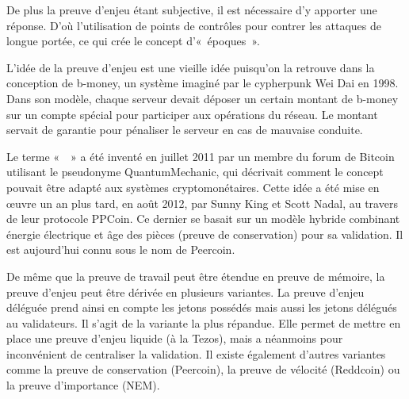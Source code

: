 %
De plus la preuve d'enjeu étant subjective, il est nécessaire d'y apporter une réponse. D'où l'utilisation de points de contrôles pour contrer les attaques de longue portée, ce qui crée le concept d'«~époques~».


L'idée de la preuve d'enjeu est une vieille idée puisqu'on la retrouve dans la conception de b-money, un système imaginé par le cypherpunk Wei Dai en 1998. Dans son modèle, chaque serveur devait déposer un certain montant de b-money sur un compte spécial pour participer aux opérations du réseau. Le montant servait de garantie pour pénaliser le serveur en cas de mauvaise conduite.

Le terme «~~» a été inventé en juillet 2011 par un membre du forum de Bitcoin utilisant le pseudonyme QuantumMechanic, qui décrivait comment le concept pouvait être adapté aux systèmes cryptomonétaires. Cette idée a été mise en œuvre un an plus tard, en août 2012, par Sunny King et Scott Nadal, au travers de leur protocole PPCoin. Ce dernier se basait sur un modèle hybride combinant énergie électrique et âge des pièces (preuve de conservation) pour sa validation. Il est aujourd'hui connu sous le nom de Peercoin.

De même que la preuve de travail peut être étendue en preuve de mémoire, la preuve d'enjeu peut être dérivée en plusieurs variantes. La preuve d'enjeu déléguée prend ainsi en compte les jetons possédés mais aussi les jetons délégués au validateurs. Il s'agit de la variante la plus répandue. Elle permet de mettre en place une preuve d'enjeu liquide (à la Tezos), mais a néanmoins pour inconvénient de centraliser la validation. Il existe également d'autres variantes comme la preuve de conservation (Peercoin), la preuve de vélocité (Reddcoin) ou la preuve d'importance (NEM).

